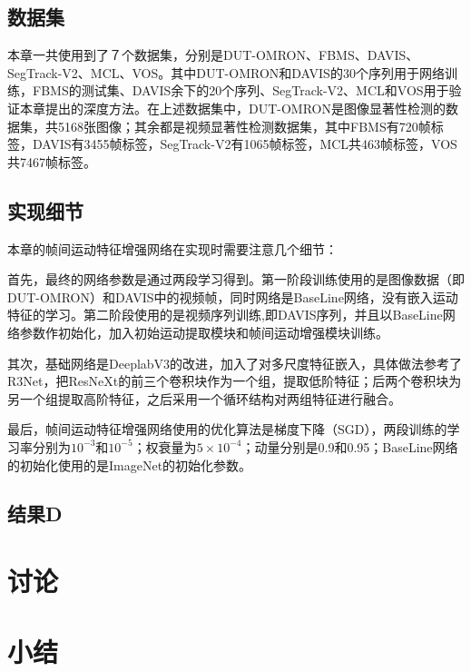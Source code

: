 \subsection{数据集}
本章一共使用到了７个数据集，分别是DUT-OMRON、FBMS、DAVIS、SegTrack-V2、MCL、VOS。其中DUT-OMRON和DAVIS的30个序列用于网络训练，FBMS的测试集、DAVIS余下的20个序列、SegTrack-V2、MCL和VOS用于验证本章提出的深度方法。在上述数据集中，DUT-OMRON是图像显著性检测的数据集，共5168张图像；其余都是视频显著性检测数据集，其中FBMS有720帧标签，DAVIS有3455帧标签，SegTrack-V2有1065帧标签，MCL共463帧标签，VOS共7467帧标签。

\subsection{实现细节}
本章的帧间运动特征增强网络在实现时需要注意几个细节：

首先，最终的网络参数是通过两段学习得到。第一阶段训练使用的是图像数据（即DUT-OMRON）和DAVIS中的视频帧，同时网络是BaseLine网络，没有嵌入运动特征的学习。第二阶段使用的是视频序列训练,即DAVIS序列，并且以BaseLine网络参数作初始化，加入初始运动提取模块和帧间运动增强模块训练。

其次，基础网络是DeeplabV3的改进，加入了对多尺度特征嵌入，具体做法参考了R3Net，把ResNeXt的前三个卷积块作为一个组，提取低阶特征；后两个卷积块为另一个组提取高阶特征，之后采用一个循环结构对两组特征进行融合。

最后，帧间运动特征增强网络使用的优化算法是梯度下降（SGD），两段训练的学习率分别为$10^{-3}$和$10^{-5}$；权衰量为$5 \times 10^{-4}$；动量分别是0.9和0.95；BaseLine网络的初始化使用的是ImageNet的初始化参数。

\subsection{结果D}
\Blindtext

\section{讨论}
\Blindtext

\section{小结}
\Blindtext 